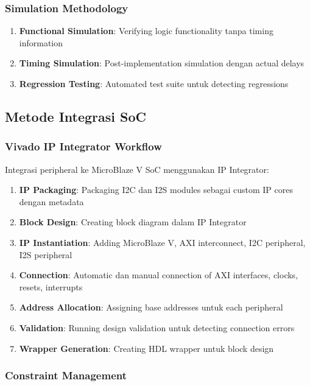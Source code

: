 \subsubsection{Simulation Methodology}

\begin{enumerate}
	\item \textbf{Functional Simulation}: Verifying logic functionality tanpa timing information
	\item \textbf{Timing Simulation}: Post-implementation simulation dengan actual delays
	\item \textbf{Regression Testing}: Automated test suite untuk detecting regressions
\end{enumerate}

\subsection{Metode Integrasi SoC}

\subsubsection{Vivado IP Integrator Workflow}

Integrasi peripheral ke MicroBlaze V SoC menggunakan IP Integrator:
\begin{enumerate}
	\item \textbf{IP Packaging}: Packaging I2C dan I2S modules sebagai custom IP cores dengan metadata
	\item \textbf{Block Design}: Creating block diagram dalam IP Integrator
	\item \textbf{IP Instantiation}: Adding MicroBlaze V, AXI interconnect, I2C peripheral, I2S peripheral
	\item \textbf{Connection}: Automatic dan manual connection of AXI interfaces, clocks, resets, interrupts
	\item \textbf{Address Allocation}: Assigning base addresses untuk each peripheral
	\item \textbf{Validation}: Running design validation untuk detecting connection errors
	\item \textbf{Wrapper Generation}: Creating HDL wrapper untuk block design
\end{enumerate}

\subsubsection{Constraint Management}

